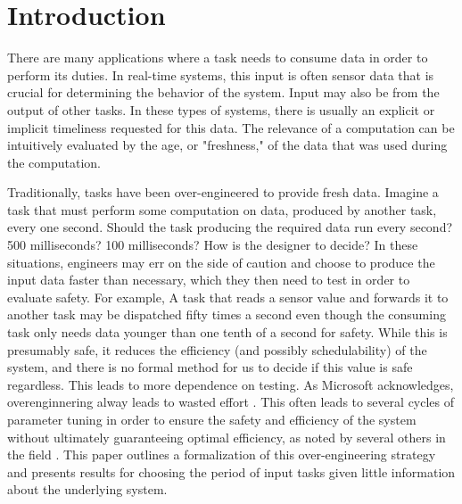 \section{Introduction}

There are many applications where a task needs to consume data in order to perform its duties. In real-time systems, this input is often sensor data that is crucial for determining the behavior of the system. Input may also be from the output of other tasks. In these types of systems, there is usually an explicit or implicit timeliness requested for this data. The relevance of a computation can be intuitively evaluated by the age, or "freshness," of the data that was used during the computation.

Traditionally, tasks have been over-engineered to provide fresh data. Imagine a task that must perform some computation on data, produced by another task, every one second. Should the task producing the required data run every second? 500 milliseconds? 100 milliseconds? How is the designer to decide? In these situations, engineers may err on the side of caution and choose to produce the input data faster than necessary, which they then need to test in order to evaluate safety. For example, A task that reads a sensor value and forwards it to another task may be dispatched fifty times a second even though the consuming task only needs data younger than one tenth of a second for safety. While this is presumably safe, it reduces the efficiency (and possibly schedulability) of the system, and there is no formal method for us to decide if this value is safe regardless. This leads to more dependence on testing. As Microsoft acknowledges, overenginnering alway leads to wasted effort \cite{CODEMINE}. This often leads to several cycles of parameter tuning in order to ensure the safety and efficiency of the system without ultimately guaranteeing optimal efficiency, as noted by several others in the field \cite{BiniNatale,SetoLehoczkySha,ChantemWangLemmonHu,BelwalCheng}. This paper outlines a formalization of this over-engineering strategy and presents results for choosing the period of input tasks given little information about the underlying system.